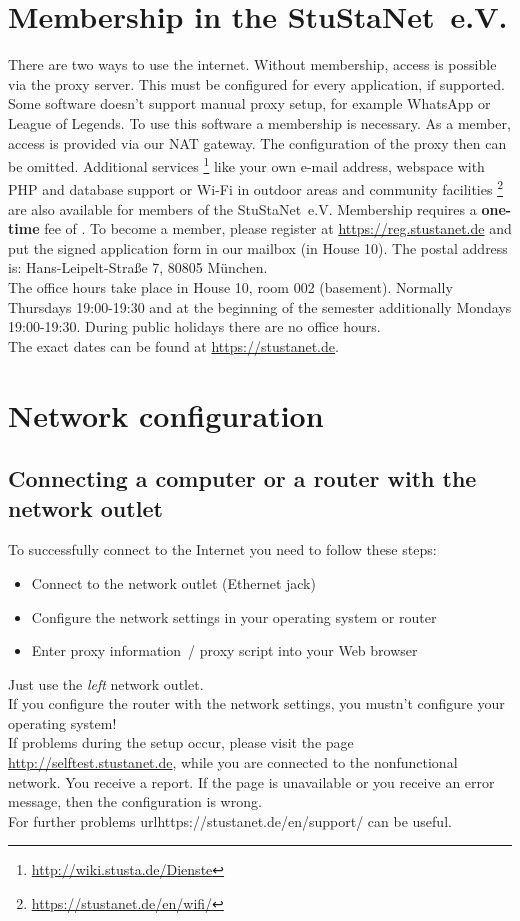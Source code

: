 \documentclass[a4paper,12pt]{scrartcl}
\begin{document}
\section*{Membership in the StuStaNet~e.V.}
There are two ways to use the internet. Without membership, access is possible via the proxy server. This must be configured for every application, if supported. Some software doesn't support manual proxy setup, for example WhatsApp or League of Legends. To use this software a membership is necessary.
\pagebreak\linebreak
As a member, access is provided via our NAT gateway. The configuration of the proxy then can be omitted. Additional services \footnote{\url{http://wiki.stusta.de/Dienste}} like your own e-mail address, webspace with PHP and database support or Wi-Fi in outdoor areas and community facilities \footnote{\url{https://stustanet.de/en/wifi/}} are also available for members of the StuStaNet~e.V. Membership requires a \textbf{one-time} fee of . To become a member, please register at \mbox{\url{https://reg.stustanet.de}} and put the signed application form in our mailbox (in House 10). The postal address is: Hans-Leipelt-Straße 7, 80805 München.
\\
The office hours take place in House 10, room 002 (basement). Normally Thursdays 19:00-19:30 and at the beginning of the semester additionally Mondays 19:00-19:30. During public holidays there are no office hours.
\\
The exact dates can be found at \mbox{\url{https://stustanet.de}}.


\section*{Network configuration}
\subsection*{Connecting a computer or a router with the network outlet}

To successfully connect to the Internet you need to follow these steps:
\begin{itemize}
    \item Connect to the network outlet (Ethernet jack)
    \item Configure the network settings in your operating system or router
    \item Enter proxy information~/ proxy script into your Web browser
\end{itemize}
Just use the \emph{left} network outlet.\\
If you configure the router with the network settings, you mustn't configure your operating system!\\
If problems during the setup occur, please visit the page \mbox{\url{http://selftest.stustanet.de}}, while you are connected to the nonfunctional network. You receive a report. If the page is unavailable or you receive an error message, then the configuration is wrong.\\
For further problems \mbox{url{https://stustanet.de/en/support/}} can be useful.
\end{document}
